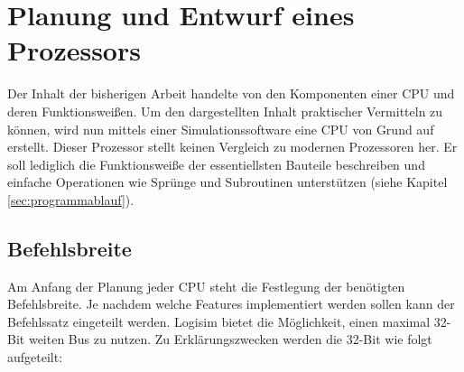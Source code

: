 \documentclass[12pt]{article}
\begin{document}
\newpage
\section{Planung und Entwurf eines Prozessors}
Der Inhalt der bisherigen Arbeit handelte von den Komponenten einer CPU und deren Funktionsweißen. Um den dargestellten Inhalt praktischer Vermitteln zu können, wird nun mittels einer Simulationssoftware eine CPU von Grund auf erstellt. Dieser Prozessor stellt keinen Vergleich zu modernen Prozessoren her. Er soll lediglich die Funktionsweiße der essentiellsten Bauteile beschreiben und einfache Operationen wie Sprünge und Subroutinen unterstützen (siehe Kapitel \ref{sec:programmablauf}).
\subsection{Befehlsbreite}
Am Anfang der Planung jeder CPU steht die Festlegung der benötigten Befehlsbreite. Je nachdem welche Features implementiert werden sollen kann der Befehlssatz eingeteilt werden. Logisim bietet die Möglichkeit, einen maximal 32-Bit weiten Bus zu nutzen. Zu Erklärungszwecken werden die 32-Bit wie folgt aufgeteilt:
\end{document}
